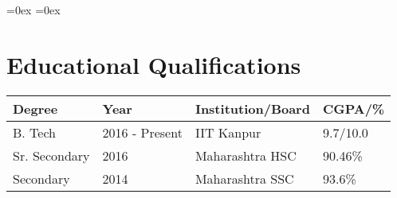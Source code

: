 \setlength\extrarowheight{3pt}  %
\aboverulesep=0ex  %
\belowrulesep=0ex  %

\section*{Educational Qualifications}
\begin{tabularx}{\textwidth}{|L|L|L|L|}

\toprule
\textbf{Degree} & \textbf{Year}  & \textbf{Institution/Board} & \textbf{CGPA/\%}\\
\midrule
B. Tech         & 2016 - Present & IIT Kanpur                 & 9.7/10.0\\
Sr. Secondary   & 2016           & Maharashtra HSC            & 90.46\%\\
Secondary       & 2014           & Maharashtra SSC            & 93.6\%\\
\bottomrule

\end{tabularx}\\[-1mm]
